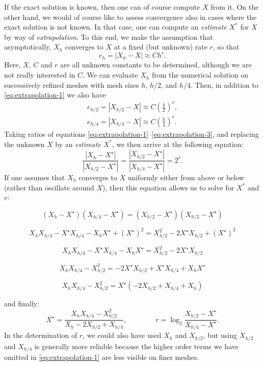 If the exact solution is known, then one can of course compute $X$ from it.
On the other hand, we would of course like to assess convergence also in
cases where the exact solution is not known. In that case, one can compute
an \textit{estimate} $X^\ast$ for $X$ by way of \textit{extrapolation}.
To this end, we make the assumption that asymptotically, $X_h$ converges to
$X$ at a fixed (but unknown) rate $r$, so that
\begin{equation}
  \label{eq:extrapolation-1}
  e_h=|X_h-X| \approx C h^r.
\end{equation}
Here, $X$, $C$ and $r$ are all unknown constants to be determined, although
we are not really interested in $C$.
We can evaluate $X_h$ from the numerical solution
on successively refined meshes with mesh sizes $h$, $h/2$, and $h/4$. Then,
in addition to \eqref{eq:extrapolation-1} we also have
\begin{eqnarray}
  \label{eq:extrapolation-2}
  e_{h/2}=|X_{h/2}-X| \approx C \left(\frac h2\right)^r,
  \\
  \label{eq:extrapolation-3}
  e_{h/4} =|X_{h/4}-X| \approx C \left(\frac h4\right)^r.
\end{eqnarray}
Taking ratios of equations \eqref{eq:extrapolation-1}--\eqref{eq:extrapolation-3},
and replacing the unknown $X$ by an \textit{estimate} $X^\ast$, we then
arrive at the following equation:
\begin{equation*}
\frac{|X_h-X^\star|}{|X_{h/2}-X^\star|}
=
\frac{|X_{h/2}-X^\star|}{|X_{h/4}-X^\star|}=2^r.
\end{equation*}
If one assumes that $X_h$ converges to $X$ uniformly either from above or
below (rather than oscillate around $X$), then this equation allows us
to solve for $X^\ast$ and $r$:

\[
(X_h-X^\star)(X_{h/4}-X^\star)=(X_{h/2}-X^\star)(X_{h/2}-X^\star)
\]

\[
X_h X_{h/4} -X^\star  X_{h/4} - X_h X^\star  + (X^\star)^2
=X_{h/2}^2 -2 X^\star X_{h/2} + (X^\star)^2 
\]

\[
X_h X_{h/4} -X^\star  X_{h/4} - X_h X^\star 
=X_{h/2}^2 -2 X^\star X_{h/2} 
\]

\[
X_h X_{h/4} -X_{h/2}^2 =-2 X^\star X_{h/2} +X^\star  X_{h/4} + X_h X^\star 
\]

\[
X_h X_{h/4} -X_{h/2}^2  = X^\star ( -2  X_{h/2}  +   X_{h/4} + X_h )
\]

and finally:
\begin{equation*}
X^\star = \frac{X_h X_{h/4}-X_{h/2}^2}{X_h - 2 X_{h/2} + X_{h/4}}, \qquad\qquad
r = \log_2 \frac{X_{h/2}-X^\star}{X_{h/4}-X^\star}.
\end{equation*}
In the determination of $r$, we could also have used $X_h$ and $X_{h/2}$,
but using $X_{h/2}$ and $X_{h/4}$ is generally more reliable because
the higher order terms we have omitted in \eqref{eq:extrapolation-1} are less
visible on finer meshes.

